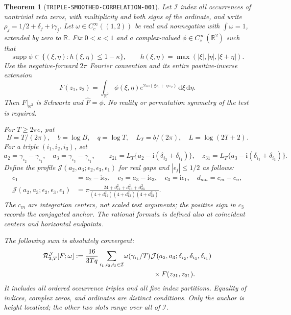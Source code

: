 \documentclass[11pt]{article}
\newtheorem{theorem}[lemma]{Theorem}
\newcommand{\ii}{\mathrm i}
\newcommand{\dd}{\,\mathrm d}
\begin{document}
\begin{theorem}[\texttt{TRIPLE-SMOOTHED-CORRELATION-001}]
\label{thm:triple-smoothed-correlation}
Let \(\mathcal I\) index all occurrences of nontrivial zeta zeros,
with multiplicity and both signs of the ordinate, and write
\(\rho_j=1/2+\delta_j+\ii\gamma_j\).
Let \(\omega\in C_c^\infty((1,2))\) be real and nonnegative with
\(\int\omega=1\), extended by zero to \(\mathbb R\).
Fix \(0<\kappa<1\) and a complex-valued
\(\phi\in C_c^\infty(\mathbb R^2)\) such that
\[
 \operatorname{supp}\phi\subset\{(\xi,\eta):h(\xi,\eta)\leq1-\kappa\},
 \qquad h(\xi,\eta)=\max(|\xi|,|\eta|,|\xi+\eta|).
\]
Use the negative-forward \(2\pi\) Fourier convention and its entire
positive-inverse extension
\[
 F(z_1,z_2)=\int_{\mathbb R^2}\phi(\xi,\eta)
                  e^{2\pi\ii(\xi z_1+\eta z_2)}\dd\xi\dd\eta.
\]
Then \(F|_{\mathbb R^2}\) is Schwartz and \(\widehat F=\phi\).
No reality or permutation symmetry of the test is required.

For \(T\geq2\pi e\), put
\[
 B=T/(2\pi),\quad b=\log B,\quad q=\log T,\quad
 L_T=b/(2\pi),\quad L=\log(2T+2).
\]
For a triple \((i_1,i_2,i_3)\), set
\[
 a_2=\gamma_{i_2}-\gamma_{i_1},\quad
 a_3=\gamma_{i_3}-\gamma_{i_1},\qquad
 z_{21}=L_T\{a_2-\ii(\delta_{i_2}+\delta_{i_1})\},\quad
 z_{31}=L_T\{a_3-\ii(\delta_{i_3}+\delta_{i_1})\}.
\]
Define the profile \(\mathcal J(a_2,a_3;\epsilon_2,\epsilon_3,\epsilon_1)\)
for real gaps and \(|\epsilon_j|\leq1/2\) as follows:
\begin{align*}
 c_1&=a_2-\ii\epsilon_2,\quad c_2=a_3-\ii\epsilon_3,
 \quad c_3=\ii\epsilon_1,\quad d_{mn}=c_m-c_n,\\
 \mathcal J(a_2,a_3;\epsilon_2,\epsilon_3,\epsilon_1)
 &=\pi\frac{24+d_{12}^2+d_{13}^2+d_{23}^2}
 {(4+d_{12}^2)(4+d_{13}^2)(4+d_{23}^2)}.
\end{align*}
The \(c_m\) are integration centers, not scaled test arguments; the
positive sign in \(c_3\) records the conjugated anchor. The rational
formula is defined also at coincident centers and horizontal endpoints.

The following sum is absolutely convergent:
\begin{equation}\label{eq:triple-assembled-observable}
 \begin{split}
 \mathcal R^{\mathcal J}_{3,T}[F;\omega]
 :=\frac{16}{3Tq}\sum_{i_1,i_2,i_3\in\mathcal I}
 &\omega(\gamma_{i_1}/T)
 \mathcal J(a_2,a_3;\delta_{i_2},\delta_{i_3},\delta_{i_1})\\
 &\hspace{15mm}{}\times F(z_{21},z_{31}).
 \end{split}
\end{equation}
It includes all ordered occurrence triples and all five index partitions.
Equality of indices, complex zeros, and ordinates are distinct conditions.
Only the anchor is height localized; the other two slots range over all
of \(\mathcal I\).


\end{theorem}
\end{document}
